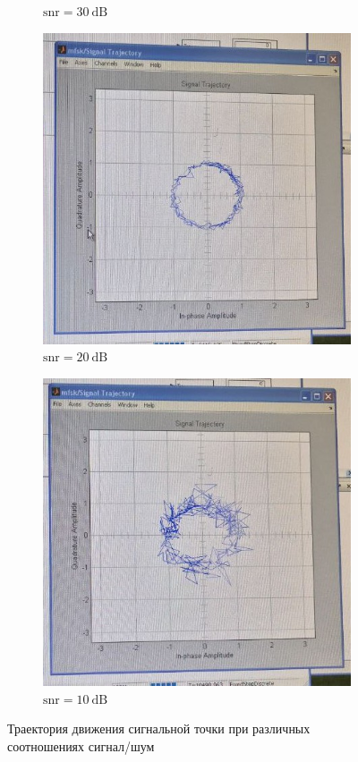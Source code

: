 \documentclass[14pt, a4paper]{article}
\begin{document}
\begin{figure}[H]
\begin{subfigure}{.5\textwidth}
  \caption{$\text{snr}=30\ \text{dB}$}
\end{subfigure}
\begin{subfigure}{.5\textwidth}
  \centering
  \includegraphics[width=.95\linewidth]{../images/rt2-9c}
  \caption{$\text{snr}=20\ \text{dB}$}
\end{subfigure}%
\begin{subfigure}{.5\textwidth}
  \centering
  \includegraphics[width=.95\linewidth]{../images/rt2-9d}
  \caption{$\text{snr}=10\ \text{dB}$}
\end{subfigure}%
\caption{Траектория движения сигнальной точки при различных соотношениях сигнал/шум}
\end{figure}
\end{document}
